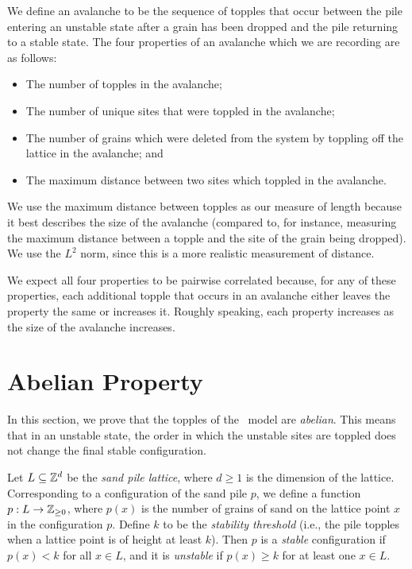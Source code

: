 We define an avalanche to be the sequence of topples that occur between the pile entering an unstable state after a grain has been dropped and the pile returning to a stable state. The four properties of an avalanche which we are recording are as follows:
\begin{itemize}
    \item[Topples] The number of topples in the avalanche;
    \item[Area] The number of unique sites that were toppled in the avalanche;
    \item[Loss] The number of grains which were deleted from the system by toppling off the lattice in the avalanche; and
    \item[Length] The maximum distance between two sites which toppled in the avalanche.
\end{itemize}

We use the maximum distance between topples as our measure of length because it best describes the size of the avalanche (compared to, for instance, measuring the maximum distance between a topple and the site of the grain being dropped). We use the $L^2$ norm, since this is a more realistic measurement of distance.

We expect all four properties to be pairwise correlated because, for any of these properties, each additional topple that occurs in an avalanche either leaves the property the same or increases it. Roughly speaking, each property increases as the size of the avalanche increases.



\section{Abelian Property}

In this section, we prove that the topples of the \btw\ model are \emph{abelian}. This means that in an unstable state, the order in which the unstable sites are toppled does not change the final stable configuration.

Let $L\subseteq \mathbb{Z}^d$ be the \emph{sand pile lattice}, where $d\ge 1$ is the dimension of the lattice. Corresponding to a configuration of the sand pile $p$, we define a function $p: L\rightarrow \mathbb{Z}_{\ge 0}$, where $p(x)$ is the number of grains of sand on the lattice point $x$ in the configuration $p$. Define $k$ to be the \emph{stability threshold} (i.e., the pile topples when a lattice point is of height at least $k$). Then $p$ is a \emph{stable} configuration if $p(x)<k$ for all $x\in L$, and it is \emph{unstable} if $p(x)\ge k$ for at least one $x\in L$.

